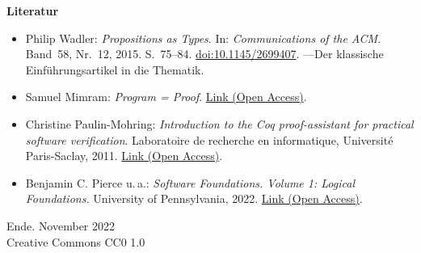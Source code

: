 \documentclass[8pt]{beamer}
\newcommand{\modest}[1]{{\small\color{gray}#1}}
\newcommand{\strong}[1]{\textsf{\textbf{#1}}}
\begin{document}
\begin{frame}
\strong{Literatur}
\begin{itemize}
\item Philip Wadler: \emph{Propositions as Types}.
In: \emph{Communications of the ACM}. Band~58, Nr.~12, 2015. S.~75--84.
\href{https://doi.org/10.1145/2699407}{doi:10.1145/2699407}.
---Der klassische Einführungsartikel in die Thematik.
\item Samuel Mimram: \emph{Program = Proof}.
\href{https://www.lix.polytechnique.fr/Labo/Samuel.Mimram/publications/}{Link (Open Access)}.
\item Christine Paulin-Mohring: \emph{Introduction to the Coq
proof-assistant for practical software verification}. Laboratoire de
recherche en informatique, Université Paris-Saclay, 2011.
\href{https://www.lri.fr/~paulin/}{Link (Open Access)}.
\item Benjamin C. Pierce u.\,a.:
\emph{Software Foundations. Volume 1: Logical Foundations.}
University of Pennsylvania, 2022.
\href{https://softwarefoundations.cis.upenn.edu/}{Link (Open Access)}.
\end{itemize}
\end{frame}

\begin{frame}
Ende.
\vfill\hfill\modest{November 2022}\\
\hfill\modest{Creative Commons CC0 1.0}
\end{frame}
\end{document}
